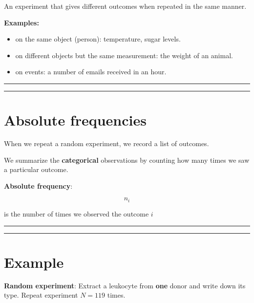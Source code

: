 \documentclass[
]{book}
\providecommand{\tightlist}{%
  \setlength{\itemsep}{0pt}\setlength{\parskip}{0pt}}
\begin{document}
An experiment that gives different outcomes when repeated in the same manner.

\textbf{Examples:}

\begin{itemize}
\tightlist
\item
  on the same object (person): temperature, sugar levels.\\
\item
  on different objects but the same measurement: the weight of an animal.
\item
  on events: a number of emails received in an hour.
\end{itemize}

\begin{center}\rule{0.5\linewidth}{0.5pt}\end{center}

\begin{center}\rule{0.5\linewidth}{0.5pt}\end{center}

\hypertarget{absolute-frequencies}{%
\section{Absolute frequencies}\label{absolute-frequencies}}

When we repeat a random experiment, we record a list of outcomes.

We summarize the \textbf{categorical} observations by counting how many times we saw a particular outcome.

\textbf{Absolute frequency}:

\[n_i\]

is the number of times we observed the outcome \(i\)

\begin{center}\rule{0.5\linewidth}{0.5pt}\end{center}

\begin{center}\rule{0.5\linewidth}{0.5pt}\end{center}

\hypertarget{example}{%
\section{Example}\label{example}}

\textbf{Random experiment}: Extract a leukocyte from \textbf{one} donor and write down its type. Repeat experiment \(N=119\) times.
\end{document}
